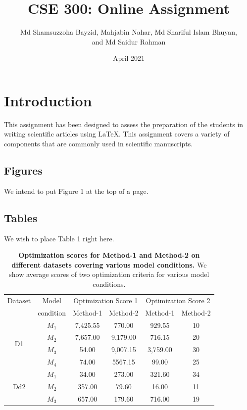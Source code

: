 \documentclass[18pt, a4paper]{extarticle} %
\title{CSE 300: Online Assignment}
\author{Md Shamsuzzoha Bayzid, Mahjabin Nahar, Md Shariful Islam Bhuyan,\\
	and Md Saidur Rahman}
\date{April 2021}
\begin{document}
	\maketitle
	
	 \section{Introduction}
	 This assignment has been designed to assess the preparation of the students in writing
	 scientific articles using \LaTeX. This assignment covers a variety of components that are
	 commonly used in scientific manuscripts.
	
	 \subsection{Figures}
	 We intend to put Figure 1 at the top of a page.
	 
	 \subsection{Tables}
	 We wish to place Table 1 right here.
	 
	 \begin{table}[h]
	 	\centering
	 	\caption{\textbf{Optimization scores for Method-1 and Method-2 on different datasets covering various model conditions.} We show average scores of two optimization criteria for various model conditions.}

	 	\vspace{10mm}
	 	\begin{tabular}{|c|c|c|c|c|c|}
	 		\hline
	 		Dataset & Model & \multicolumn{2}{|c|}{Optimization Score 1} & \multicolumn{2}{|c|}{Optimization Score 2}\\
	 		\cline{3-6} %
	 		& condition & Method-1 & Method-2 & Method-1 & Method-2 \\
	 		\hline
	 		\hline
	 		
	 		\multirow{4}{*}{D1} & $M_1$ & 7,425.55 & 770.00 & 929.55 & 10 \\
	 		& $M_2$ & 7,657.00 & 9,179.00 & 716.15 & 20 \\
	 		& $M_3$ & 54.00 & 9,007.15 & 3,759.00 & 30 \\
	 		& $M_4$ & 74.00 & 5567.15 & 99.00 & 25 \\
	 		\hline
	 		
	 		\multirow{3}{*}{Dd2} & $M_1$ & 34.00 & 273.00 & 321.60 & 34 \\
	 		& $M_2$ & 357.00 & 79.60 & 16.00 & 11 \\
	 		& $M_3$ & 657.00 & 179.60 & 716.00 & 19 \\
	 		\hline
	 		
	 	\end{tabular}
	 \end{table}
	 \newpage
	 
\end{document}
